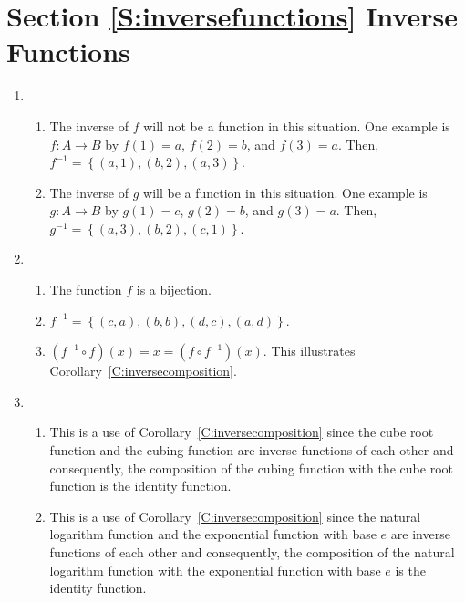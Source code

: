 \section*{Section \ref{S:inversefunctions} Inverse Functions}

\begin{enumerate}
\item \begin{enumerate}
\item The inverse of $f$ will not be a function in this situation.  One example is $f:A \to B$ by $f \left( 1 \right) = a$, $f \left( 2 \right) = b$, and $f \left( 3 \right) = a$.  Then, 
$f^{-1} = \left\{ \left( a, 1 \right), \left( b, 2 \right), \left( a, 3 \right) \right\}$.

\item The inverse of $g$ will be a function in this situation.  One example is $g:A \to B$ by 
$g \left( 1 \right) = c$, $g \left( 2 \right) = b$, and $g \left( 3 \right) = a$.  Then, 
$g^{-1} = \left\{ \left( a, 3 \right), \left( b, 2 \right), \left( c, 1 \right) \right\}$.
\end{enumerate}



\item \begin{enumerate}
\item The function $f$ is a bijection.

\item $f^{ - 1}  = \left\{ {\left( {c,a} \right),\left( {b,b} \right),\left( {d,c} \right),\left( {a,d} \right)} \right\}$.

\addtocounter{enumii}{1}
\item $\left( {f^{ - 1}  \circ f} \right)\left( x \right) = x = \left( {f \circ f^{ - 1} } \right)\left( x \right)$.  This illustrates Corollary~\ref{C:inversecomposition}.
\end{enumerate}



\item \begin{enumerate}
\item This is a use of Corollary~\ref{C:inversecomposition} since the cube root function and the cubing function are inverse functions of each other and consequently, the composition of the cubing function with the cube root function is the identity function.

\item This is a use of Corollary~\ref{C:inversecomposition} since the natural logarithm function  and the exponential function with base $e$ are inverse functions of each other and consequently, the composition of the natural logarithm function with the exponential function with base $e$ is the identity function.


\end{enumerate}
\end{enumerate}
